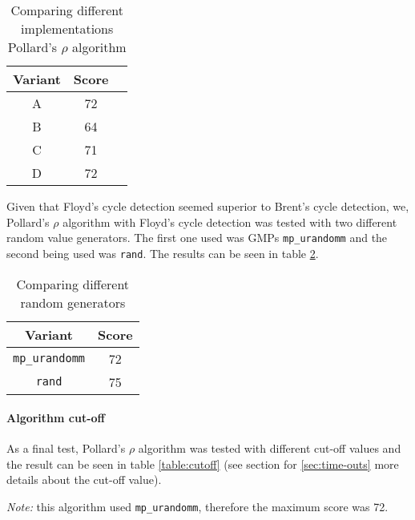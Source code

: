\begin{table}[h!]
    \centering
    \begin{tabular}{|c|c|c|}
    \hline
    \textbf{Variant} & \textbf{Score} \\ \hline
    A                & 72             \\ \hline
    B                & 64             \\ \hline
    C                & 71             \\ \hline
    D                & 72             \\ \hline
    \end{tabular}
    \caption{Comparing different implementations Pollard's $\rho$ algorithm}
    \label{table:pollard-comparison}
\end{table}

Given that Floyd's cycle detection seemed superior to Brent's cycle detection,
we, Pollard's $\rho$ algorithm with Floyd's cycle detection was tested with 
two different random value generators. 
The first one used was GMPs \texttt{mp\_urandomm} and the second
being used was \texttt{rand}. The results can be seen in table
\ref{table:random}.

\begin{table}[h!]
    \centering
    \begin{tabular}{|c|c|}
    \hline
    \textbf{Variant}     & \textbf{Score} \\ \hline
    \texttt{mp\_urandomm} & 72             \\ \hline
    \texttt{rand}        & 75             \\ \hline
    \end{tabular}
    \caption{Comparing different random generators}
    \label{table:random}
\end{table}

\paragraph{Algorithm cut-off}
As a final test, Pollard's $\rho$ algorithm was tested with different cut-off
values and the result can be seen in table \ref{table:cutoff} (see section for
\ref{sec:time-outs} more details about the cut-off value).

\emph{Note:} this algorithm used \texttt{mp\_urandomm}, therefore the maximum
score was 72.

